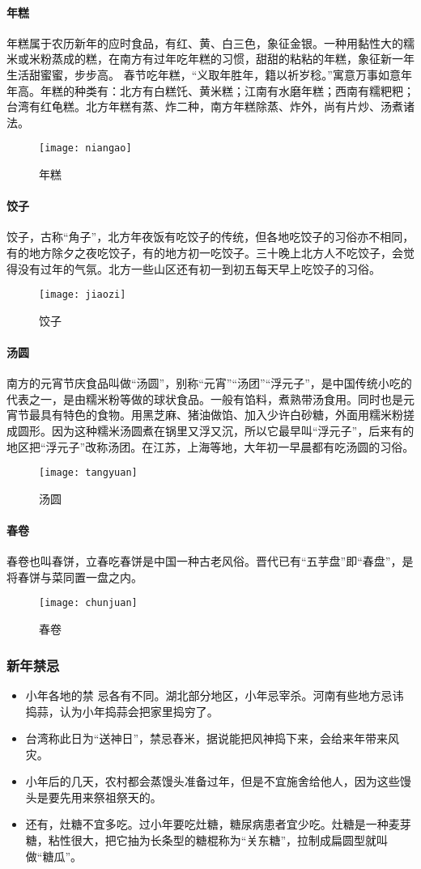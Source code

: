 \paragraph{年糕}
年糕属于农历新年的应时食品，有红、黄、白三色，象征金银。一种用黏性大的糯米或米粉蒸成的糕，在南方有过年吃年糕的习惯，甜甜的粘粘的年糕，象征新一年生活甜蜜蜜，步步高。
春节吃年糕，“义取年胜年，籍以祈岁稔。”寓意万事如意年年高。年糕的种类有：北方有白糕饦、黄米糕；江南有水磨年糕；西南有糯粑粑；台湾有红龟糕。北方年糕有蒸、炸二种，南方年糕除蒸、炸外，尚有片炒、汤煮诸法。 
\begin{figure}[htb]
    \centering
    \texttt{[image: niangao]}
    \caption{年糕}
\end{figure}
\paragraph{饺子}
饺子，古称“角子”，北方年夜饭有吃饺子的传统，但各地吃饺子的习俗亦不相同，有的地方除夕之夜吃饺子，有的地方初一吃饺子。三十晚上北方人不吃饺子，会觉得没有过年的气氛。北方一些山区还有初一到初五每天早上吃饺子的习俗。
\begin{figure}[htb]
    \centering
    \texttt{[image: jiaozi]}
    \caption{饺子}
\end{figure}
\paragraph{汤圆}
南方的元宵节庆食品叫做“汤圆”，别称“元宵”“汤团”“浮元子”，是中国传统小吃的代表之一，是由糯米粉等做的球状食品。一般有馅料，煮熟带汤食用。同时也是元宵节最具有特色的食物。用黑芝麻、猪油做馅、加入少许白砂糖，外面用糯米粉搓成圆形。因为这种糯米汤圆煮在锅里又浮又沉，所以它最早叫“浮元子”，后来有的地区把“浮元子”改称汤团。在江苏，上海等地，大年初一早晨都有吃汤圆的习俗。
\begin{figure}[htb]
    \centering
    \texttt{[image: tangyuan]}
    \caption{汤圆}
\end{figure}
\paragraph{春卷}
春卷也叫春饼，立春吃春饼是中国一种古老风俗。晋代已有“五芋盘”即“春盘”，是将春饼与菜同置一盘之内。
\begin{figure}[htb]
    \centering
    \texttt{[image: chunjuan]}
    \caption{春卷}
\end{figure}
\subsubsection{新年禁忌}
\begin{itemize}
\item 
小年各地的禁 忌各有不同。湖北部分地区，小年忌宰杀。河南有些地方忌讳捣蒜，认为小年捣蒜会把家里捣穷了。
\item
台湾称此日为“送神日”，禁忌舂米，据说能把风神捣下来，会给来年带来风灾。
\item 
小年后的几天，农村都会蒸馒头准备过年，但是不宜施舍给他人，因为这些馒头是要先用来祭祖祭天的。
\item 
还有，灶糖不宜多吃。过小年要吃灶糖，糖尿病患者宜少吃。灶糖是一种麦芽糖，粘性很大，把它抽为长条型的糖棍称为“关东糖”，拉制成扁圆型就叫做“糖瓜”。
\end{itemize}